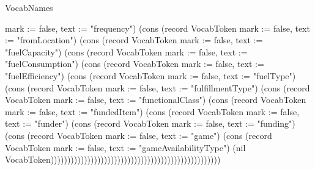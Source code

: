 \begin{lexlean}{VocabNames}
\begin{semanticmodule}
{{mark := false, text := "frequency"}) (cons (record VocabToken {mark := false, text := "fromLocation"}) (cons (record VocabToken {mark := false, text := "fuelCapacity"}) (cons (record VocabToken {mark := false, text := "fuelConsumption"}) (cons (record VocabToken {mark := false, text := "fuelEfficiency"}) (cons (record VocabToken {mark := false, text := "fuelType"}) (cons (record VocabToken {mark := false, text := "fulfillmentType"}) (cons (record VocabToken {mark := false, text := "functionalClass"}) (cons (record VocabToken {mark := false, text := "fundedItem"}) (cons (record VocabToken {mark := false, text := "funder"}) (cons (record VocabToken {mark := false, text := "funding"}) (cons (record VocabToken {mark := false, text := "game"}) (cons (record VocabToken {mark := false, text := "gameAvailabilityType"}) (nil VocabToken)))))))))))))))))))))))))))))))))))))))))))))))))))
}


\end{semanticmodule}
\end{lexlean}

